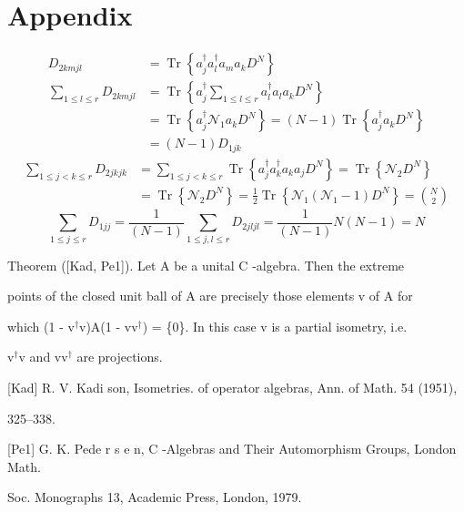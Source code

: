 \documentclass[aps,preprint]{revtex4}%
\begin{document}
\section{Appendix}%

\begin{align}
D_{2kmjl}  &  =\operatorname{Tr}\left\{  a_{j}^{\dagger}a_{l}^{\dagger}%
a_{m}a_{k}D^{N}\right\} \\
\sum_{1\leq l\leq r}D_{2kmjl}  &  =\operatorname{Tr}\left\{  a_{j}^{\dagger
}\sum_{1\leq l\leq r}a_{l}^{\dagger}a_{l}a_{k}D^{N}\right\} \\
&  =\operatorname{Tr}\left\{  a_{j}^{\dagger}\mathcal{N}_{1}a_{k}%
D^{N}\right\}  =\left(  N-1\right)  \operatorname{Tr}\left\{  a_{j}^{\dagger
}a_{k}D^{N}\right\} \\
&  =\left(  N-1\right)  D_{1jk}%
\end{align}%
\begin{align*}
\sum_{1\leq j<k\leq r}D_{2jkjk}  &  =\sum_{1\leq j<k\leq r}\operatorname{Tr}%
\left\{  a_{j}^{\dagger}a_{k}^{\dagger}a_{k}a_{j}D^{N}\right\}
=\operatorname{Tr}\left\{  \mathcal{N}_{2}D^{N}\right\} \\
&  =\operatorname{Tr}\left\{  \mathcal{N}_{2}D^{N}\right\}  =\frac{1}%
{2}\operatorname{Tr}\left\{  \mathcal{N}_{1}\left(  \mathcal{N}_{1}-1\right)
D^{N}\right\}  =\binom{N}{2}%
\end{align*}%
\begin{equation}
\sum_{1\leq j\leq r}D_{1jj}=\frac{1}{\left(  N-1\right)  }\sum_{1\leq j,l\leq
r}D_{2jljl}=\frac{1}{\left(  N-1\right)  }N\left(  N-1\right)  =N
\end{equation}


\bigskip

Theorem ([Kad, Pe1]). Let A be a unital C -algebra. Then the extreme

points of the closed unit ball of A are precisely those elements v of A for

which (1 - v$^{\dagger}$v)A(1 - vv$^{\dagger}$) = \{0\}. In this case v is a
partial isometry, i.e.

v$^{\dagger}$v and vv$^{\dagger}$ are projections.

[Kad] R. V. Kadi son, Isometries. of operator algebras, Ann. of Math. 54 (1951),

325--338.

[Pe1] G. K. Pede r s e n, C -Algebras and Their Automorphism Groups, London Math.

Soc. Monographs 13, Academic Press, London, 1979.
\end{document}
